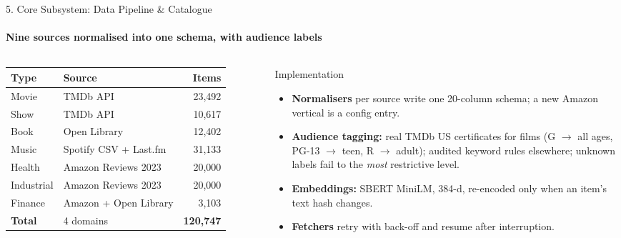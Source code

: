 \documentclass[aspectratio=169, 11pt]{beamer}
\begin{document}
\begin{frame}{5. Core Subsystem: Data Pipeline \& Catalogue}
    \framesubtitle{Nine sources normalised into one schema, with audience labels}
    \begin{columns}[T]
        \scriptsize
        \renewcommand{\arraystretch}{1.15}
        \begin{tabular}{l l r}
            \toprule
            \textbf{Type} & \textbf{Source} & \textbf{Items} \\
            \midrule
            Movie & TMDb API & 23,492 \\
            Show & TMDb API & 10,617 \\
            Book & Open Library & 12,402 \\
            Music & Spotify CSV + Last.fm & 31,133 \\
            Health & Amazon Reviews 2023 & 20,000 \\
            Industrial & Amazon Reviews 2023 & 20,000 \\
            Finance & Amazon + Open Library & 3,103 \\
            \midrule
            \textbf{Total} & 4 domains & \textbf{120,747} \\
            \bottomrule
        \end{tabular}
        \begin{block}{Implementation}
            \scriptsize
            \begin{itemize}
                \item \textbf{Normalisers} per source write one 20-column schema; a new Amazon vertical is a config entry.
                \item \textbf{Audience tagging:} real TMDb US certificates for films (G $\rightarrow$ all ages, PG-13 $\rightarrow$ teen, R $\rightarrow$ adult); audited keyword rules elsewhere; unknown labels fail to the \emph{most} restrictive level.
                \item \textbf{Embeddings:} SBERT MiniLM, 384-d, re-encoded only when an item's text hash changes.
                \item \textbf{Fetchers} retry with back-off and resume after interruption.
            \end{itemize}
        \end{block}
    \end{columns}
\end{frame}
\end{document}
